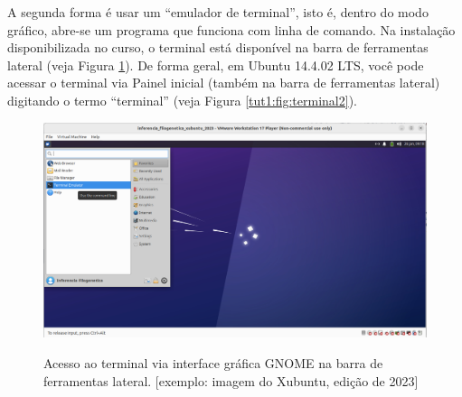 \begin{refsection}

A segunda forma é usar um ``emulador de terminal'', isto é, dentro do modo gráfico, abre-se um programa que funciona com linha de comando. Na instalação disponibilizada no curso, o terminal está disponível na barra de ferramentas lateral (veja Figura \ref{tut1:fig:terminal1}). De forma geral, em Ubuntu 14.4.02 LTS, você pode acessar o terminal via Painel inicial (também na barra de ferramentas lateral) digitando o termo ``terminal'' (veja Figura \ref{tut1:fig:terminal2}).\\

  \begin{figure}[H]
      {\includegraphics[scale=0.35]{figures/tut1/terminal1.jpg}}
      {\caption[\textit{Acesso ao terminal via interface gráfica GNOME}]{Acesso ao terminal via interface gráfica GNOME na barra de ferramentas lateral. [exemplo: imagem do Xubuntu, edição de 2023]}\label{tut1:fig:terminal1}}
  \end{figure}



\end{refsection}
